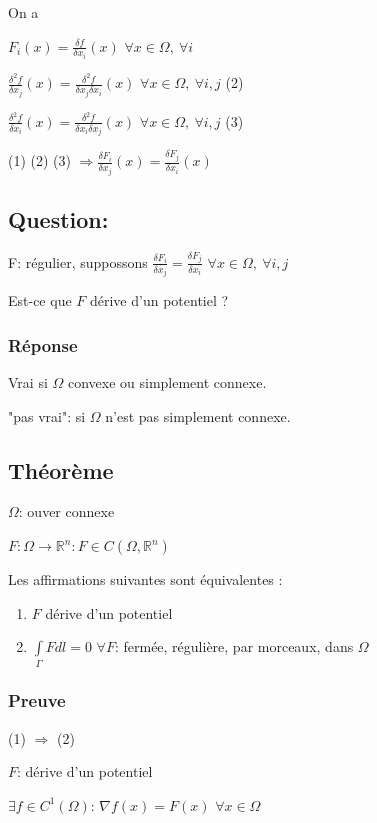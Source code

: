\documentclass[11pt]{article}
\begin{document}
On a

\(F_i(x) = \frac{\delta f}{\delta x_i}(x)\) \(\forall x \in \Omega,\ \forall i\)

\(\frac{\delta^2 f}{\delta x_j}(x) = \frac{\delta^2 f}{\delta x_j \delta x_i}(x)\)  \(\forall x \in \Omega,\ \forall i,j\) (2)

\(\frac{\delta^2 f}{\delta x_i}(x) = \frac{\delta^2 f}{\delta x_i \delta x_j}(x)\)  \(\forall x \in \Omega,\ \forall i,j\) (3)

(1) (2) (3) \(\Rightarrow \frac{\delta F_i}{\delta x_j}(x) = \frac{\delta F_j}{\delta x_i}(x)\) 
\subsection{Question:}
\label{sec:orgheadline33}
F: régulier, suppossons \(\frac{\delta F_i}{\delta x_j}=\frac{\delta F_j}{\delta x_i}\) \(\forall x \in \Omega,\ \forall i,j\)

Est-ce que \(F\) dérive d'un potentiel ?
\subsubsection{Réponse}
\label{sec:orgheadline32}
Vrai si \(\Omega\) convexe ou simplement connexe.

"pas vrai": si \(\Omega\) n'est pas simplement connexe.
\subsection{Théorème}
\label{sec:orgheadline35}
\(\Omega\): ouver connexe

\(F: \Omega \rightarrow \mathbb{R}^n: F\in C(\Omega,\mathbb{R}^n)\)

Les affirmations suivantes sont équivalentes :
\begin{enumerate}
\item \(F\) dérive d'un potentiel
\item \(\int\limits_\Gamma F dl = 0\) \(\forall F\): fermée, régulière, par morceaux, dans \(\Omega\)
\end{enumerate}

\subsubsection{Preuve}
\label{sec:orgheadline34}
(1) \(\Rightarrow\) (2)

\(F\): dérive d'un potentiel

\(\exists f \in C^1(\Omega)\): \(\nabla f(x) = F(x)\) \(\forall x \in \Omega\)
\end{document}
